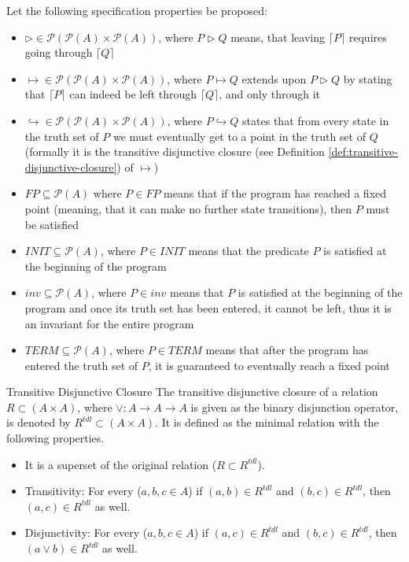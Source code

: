 Let the following specification properties be proposed:
\begin{itemize}
    \item $\rhd \in \mathcal{P}(\mathcal{P}(A) \times \mathcal{P}(A))$, where $P \rhd Q$ means, that leaving $\lceil P \rceil$ requires going through $\lceil Q \rceil$
    \item $\mapsto \in \mathcal{P}(\mathcal{P}(A) \times \mathcal{P}(A))$, where $P \mapsto Q$ extends upon $P \rhd Q$ by stating that $\lceil P \rceil$ can indeed be left through $\lceil Q \rceil$, and only through it
    \item $\hookrightarrow \in \mathcal{P}(\mathcal{P}(A) \times
      \mathcal{P}(A))$, where $P \hookrightarrow Q$ states that from every state in the truth set of $P$ we must eventually get to a point in the truth set of $Q$ (formally it is the transitive disjunctive closure (see Definition
      \ref{def:transitive-disjunctive-closure}) of $\mapsto$)
    \item $FP \subseteq \mathcal{P}(A)$ where $P \in FP$ means that if the program has reached a fixed point (meaning, that it can make no further state transitions), then $P$ must be satisfied
    \item $INIT \subseteq \mathcal{P}(A)$, where $P \in INIT$ means that the predicate $P$ is satisfied at the beginning of the program
    \item $inv \subseteq \mathcal{P}(A)$, where $P \in inv$ means that $P$ is satisfied at the beginning of the program and once its truth set has been entered, it cannot be left, thus it is an invariant for the entire program
    \item $TERM \subseteq \mathcal{P}(A)$, where $P \in TERM$ means that after the program has entered the truth set of $P$, it is guaranteed to eventually reach a fixed point
\end{itemize}

\begin{definition}{Transitive Disjunctive Closure}
\label{def:transitive-disjunctive-closure}
The transitive disjunctive closure of a relation $R \subset (A \times A)$, where $\lor : A \to A \to A$ is given as the binary disjunction operator, is denoted by $R^{tdl} \subset (A \times A)$. It is defined as the minimal relation with the following properties.
\begin{itemize}
    \item It is a superset of the original relation ($R \subset R^{tdl}$).
    \item Transitivity: For every ($a, b, c \in A$) if $(a, b) \in R^{tdl}$ and $(b, c) \in R^{tdl}$, then $(a, c) \in R^{tdl}$ as well.
    \item Disjunctivity: For every ($a, b, c \in A$) if $(a, c) \in R^{tdl}$ and $(b, c) \in R^{tdl}$, then $(a \lor b) \in R^{tdl}$ as well.
\end{itemize}
\end{definition}

